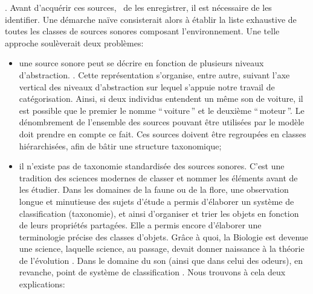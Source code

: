  . Avant d'acquérir ces sources, \ie~de les enregistrer, il est nécessaire de les identifier. Une démarche naïve consisterait alors à établir la liste exhaustive de toutes les classes de sources sonores composant l'environnement. Une telle approche soulèverait deux problèmes:
\begin{itemize}
\item une source sonore peut se décrire en fonction de plusieurs niveaux d'abstraction.  . Cette représentation s'organise, entre autre, suivant l'axe vertical des niveaux d'abstraction sur lequel s'appuie notre travail de catégorisation. Ainsi, si deux individus entendent un même son de voiture, il est possible que le premier le nomme ``\,voiture\,'' et le deuxième ``\,moteur\,''. Le dénombrement de l'ensemble des sources pouvant être utilisées par le modèle doit prendre en compte ce fait. Ces sources doivent être regroupées en classes hiérarchisées, afin de bâtir une structure taxonomique;
\item il n'existe pas de taxonomie standardisée des sources sonores. C'est une tradition des sciences modernes de classer et nommer les éléments avant de les étudier. Dans les domaines de la faune ou de la flore, une observation longue et minutieuse des sujets d'étude a permis d'élaborer un système de classification (taxonomie), et ainsi d'organiser et trier les objets en fonction de leurs propriétés partagées. Elle a permis encore d'élaborer une terminologie précise des classes d'objets. Grâce à quoi, la Biologie est devenue une science, laquelle science, au passage, devait donner naissance à la théorie de l'évolution \citep{lecointre2006tree}. Dans le domaine du son (ainsi que dans celui des odeurs), en revanche, point de système de classification \citep{dubois2000categories,niessen2010categories}. Nous trouvons à cela deux explications:


\end{itemize}
